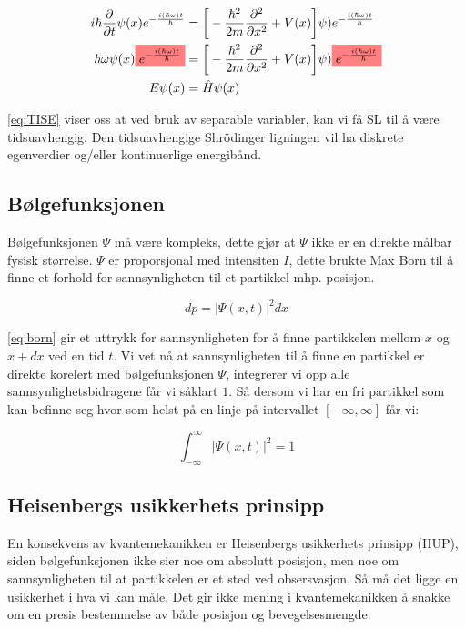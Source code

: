 \begin{equation}
    \label{eq:TISE}
\begin{split}
    i\hbar\frac{\partial}{\partial t} \psi(x)e^{-\frac{i(\hbar\omega)t}{\hbar}} &= 
    \bigg[ 
    -\frac{\hbar^2}{2m} \frac{\partial^2}{\partial x^2} + V(x)
    \bigg] \psi)e^{-\frac{i(\hbar\omega)t}{\hbar}}\\
    \hbar\omega\psi(x) \highlight{e^{-\frac{i(\hbar\omega)t}{\hbar}}} &=
    \bigg[ 
    -\frac{\hbar^2}{2m} \frac{\partial^2}{\partial x^2} + V(x)
    \bigg] \psi)\highlight{e^{-\frac{i(\hbar\omega)t}{\hbar}}} \\
    E\psi(x) &= \hat{H}\psi(x)
\end{split}
\end{equation}

\autoref{eq:TISE} viser oss at ved bruk av separable variabler, kan vi få SL til å være tidsuavhengig. Den tidsuavhengige Shrödinger ligningen vil ha diskrete egenverdier og/eller kontinuerlige energibånd.

\subsection{Bølgefunksjonen}
\label{sec:tema1_7}
Bølgefunksjonen $\Psi$ må være kompleks, dette gjør at $\Psi$ ikke er en direkte målbar fysisk størrelse. $\Psi$ er proporsjonal med intensiten $I$, dette brukte Max Born til å finne et forhold for sannsynligheten til et partikkel mhp. posisjon.

\begin{equation}
\label{eq:born}
    dp = |\Psi(x,t)|^2dx
\end{equation}

\autoref{eq:born} gir et uttrykk for sannsynligheten for å finne partikkelen mellom $x$ og $x + dx$ ved en tid $t$. Vi vet nå at sannsynligheten til å finne en partikkel er direkte korelert med bølgefunksjonen $\Psi$, integrerer vi opp alle sannsynlighetsbidragene får vi såklart $1$. Så dersom vi har en fri partikkel som kan befinne seg hvor som helst på en linje på intervallet $[-\infty,\infty]$ får vi:

\begin{equation}
    \label{eq:normalisering}
    \int_{-\infty}^{\infty} |\Psi(x,t)|^2 = 1
\end{equation}

\subsection{Heisenbergs usikkerhets prinsipp}
\label{sec:tema1_8}
En konsekvens av kvantemekanikken er Heisenbergs usikkerhets prinsipp (HUP), siden bølgefunksjonen ikke sier noe om absolutt posisjon, men noe om sannsynligheten til at partikkelen er et sted ved obsersvasjon. Så må det ligge en usikkerhet i hva vi kan måle. Det gir ikke mening i kvantemekanikken å snakke om en presis bestemmelse av både posisjon og bevegelsesmengde. 

